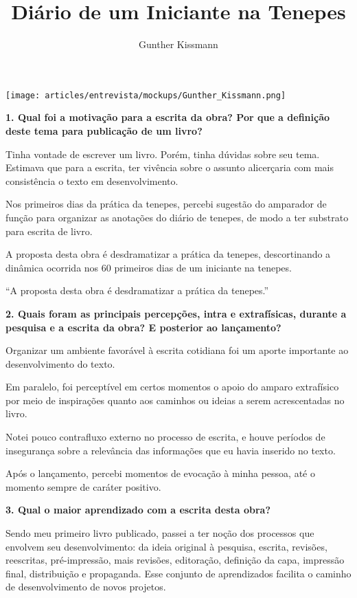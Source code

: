 \documentclass{gescons}
\author{Gunther Kissmann}
\title{Diário de um Iniciante na Tenepes}
\begin{document}
    \makeentrevistatitle

    \begin{multicols}{2}

\begin{center}
    \texttt{[image: articles/entrevista/mockups/Gunther\_Kissmann.png]}
\end{center}


\textbf{1. Qual foi a motivação para a escrita da obra? Por que a definição deste tema para publicação de um livro?}

Tinha vontade de escrever um livro. Porém, tinha dúvidas sobre seu tema. Estimava que para a escrita, ter vivência sobre o assunto alicerçaria com mais consistência o texto em desenvolvimento.

Nos primeiros dias da prática da tenepes, percebi sugestão do amparador de função para organizar as anotações do diário de tenepes, de modo a ter substrato para escrita de livro.

A proposta desta obra é desdramatizar a prática da tenepes, descortinando a dinâmica ocorrida nos 60 primeiros dias de um iniciante na tenepes.

\begin{pullquote}
``A proposta desta obra é desdramatizar a prática da tenepes.''
\end{pullquote}

\textbf{2. Quais foram as principais percepções, intra e extrafísicas, durante a pesquisa e a escrita da obra? E posterior ao lançamento?}

Organizar um ambiente favorável à escrita cotidiana foi um aporte importante ao desenvolvimento do texto.

Em paralelo, foi perceptível em certos momentos o apoio do amparo extrafísico por meio de inspirações quanto aos caminhos ou ideias a serem acrescentadas no livro.

Notei pouco contrafluxo externo no processo de escrita, e houve períodos de insegurança sobre a relevância das informações que eu havia inserido no texto.

Após o lançamento, percebi momentos de evocação à minha pessoa, até o momento sempre de caráter positivo.

\textbf{3. Qual o maior aprendizado com a escrita desta obra?}

Sendo meu primeiro livro publicado, passei a ter noção dos processos que envolvem seu desenvolvimento: da ideia original à pesquisa, escrita, revisões, reescritas, pré-impressão, mais revisões, editoração, definição da capa, impressão final, distribuição e propaganda. Esse conjunto de aprendizados facilita o caminho de desenvolvimento de novos projetos.


\end{multicols}
\end{document}

